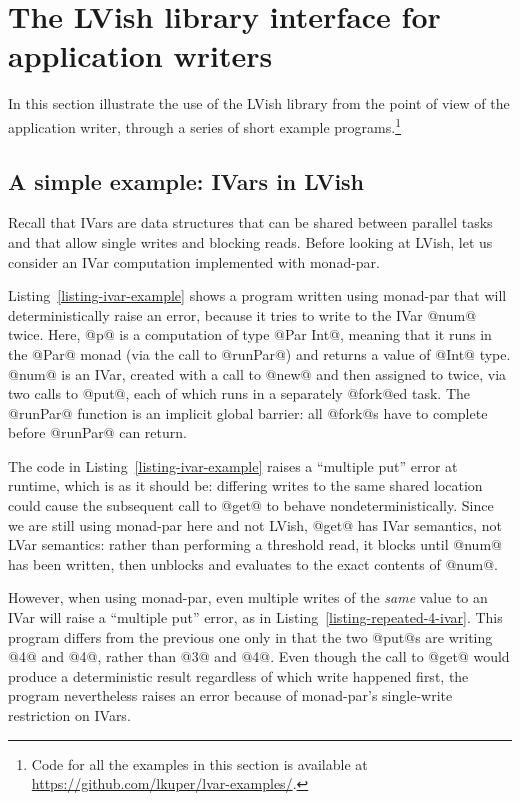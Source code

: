 \section{The LVish library interface for application writers}\label{s:lvish-api}

In this section  illustrate the use of the LVish library
from the point of view of the application writer, through a series of
short example programs.\footnote{Code for all the examples in this
  section is available at
  \url{https://github.com/lkuper/lvar-examples/}.}

\subsection{A simple example: IVars in LVish}

\ifdefined\DISSERTATION

Recall that IVars are data structures that can be shared between
parallel tasks and that allow single writes and blocking reads.
Before looking at LVish, let us consider an IVar computation
implemented with monad-par.

Listing~\ref{listing-ivar-example} shows a program written using
monad-par that will deterministically raise an error, because it tries
to write to the IVar @num@ twice.  Here, @p@ is a computation of type
@Par Int@, meaning that it runs in the @Par@ monad (via the call to
@runPar@) and returns a value of @Int@ type.  @num@ is an IVar,
created with a call to @new@ and then assigned to twice, via two calls
to @put@, each of which runs in a separately @fork@ed task.  The
@runPar@ function is an implicit global barrier: all @fork@s have to
complete before @runPar@ can return.

\singlespacing

\doublespacing

The code in Listing~\ref{listing-ivar-example} raises a ``multiple
put'' error at runtime, which is as it should be: differing writes to
the same shared location could cause the subsequent call to @get@ to
behave nondeterministically.  Since we are still using monad-par here
and not LVish, @get@ has IVar semantics, not LVar semantics: rather
than performing a threshold read, it blocks until @num@ has been
written, then unblocks and evaluates to the exact contents of @num@.

However, when using monad-par, even multiple writes of the \emph{same}
value to an IVar will raise a ``multiple put'' error, as in
Listing~\ref{listing-repeated-4-ivar}.  This program differs from the
previous one only in that the two @put@s are writing @4@ and @4@,
rather than @3@ and @4@.  Even though the call to @get@ would produce
a deterministic result regardless of which write happened first, the
program nevertheless raises an error because of monad-par's
single-write restriction on IVars.

